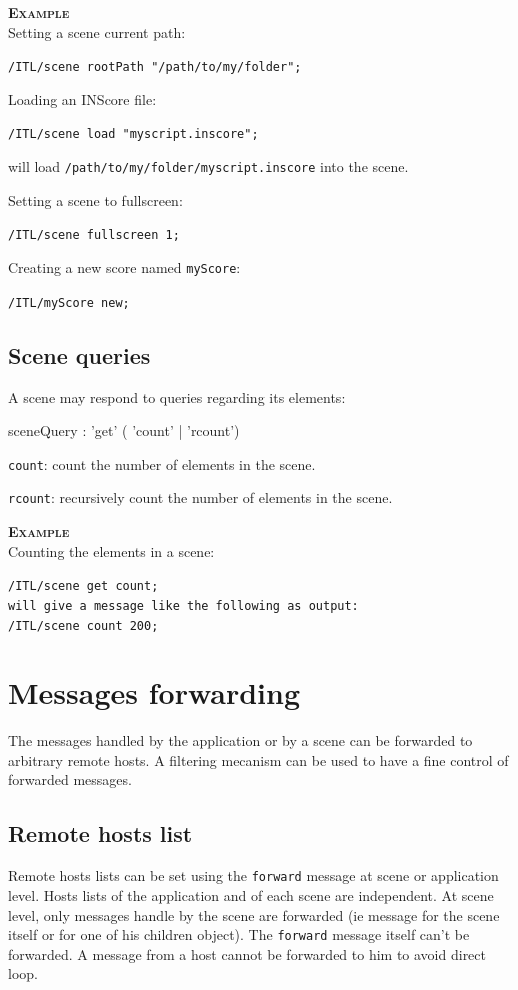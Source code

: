 \documentclass[a4paper,twoside]{report}
\newcommand{\toplevel}[1]	{\chapter{#1}}
\newcommand{\sublevel}[1]	{\section{#1}}
\newcommand{\OSC}[1]		{\texttt{#1}}
\newcommand{\example}		{\textbf{\hspace{-1.5cm}\textbf{\textsc{Example }}}}
\let\olditemize\itemize
\let\oldenditemize\enditemize
\renewenvironment{itemize} 	{\olditemize \setlength{\itemsep}{1mm}}{\oldenditemize}
\newcommand{\sample}	[1]			{\vspace{-2mm}\begin{center}\colorbox{mygrey}{
								\begin{minipage}[t]{0.9\columnwidth} 
								{\small \texttt{#1}}
								\end{minipage}}\end{center}}
\newcommand{\sampleindent}	{ \hspace{0.5cm} }
\begin{document}
\example \\
Setting a scene current path:
\sample{/ITL/scene rootPath "/path/to/my/folder";}
Loading an INScore file:
\sample{/ITL/scene load "myscript.inscore";}
\sampleindent will load \OSC{/path/to/my/folder/myscript.inscore} into the scene. 

Setting a scene to fullscreen:
\sample{/ITL/scene fullscreen 1;}
Creating a new score named \OSC{myScore}:
\sample{/ITL/myScore new;}


\sublevel{Scene queries}
\label{scenequery}

A scene may respond to queries regarding its elements:
\begin{rail}
sceneQuery : 'get' ( 'count'
					| 'rcount')
\end{rail}

\begin{itemize}
\item \OSC{count}: count the number of elements in the scene.
\item \OSC{rcount}: recursively count the number of elements in the scene.
\end{itemize}

\example \\
Counting the elements in a scene:
\sample{/ITL/scene get count;\\
\hspace*{5mm}will give a message like the following as output: \\
/ITL/scene count 200;
}

\toplevel{Messages forwarding}
\label{forwarding}
The messages handled by the application or by a scene can be forwarded to arbitrary remote hosts. A filtering mecanism can be used to have a fine control of forwarded messages.

\sublevel{Remote hosts list}
\label{ITLForward}

Remote hosts lists can be set using the \OSC{forward} message at scene or application level. Hosts lists of the application and of each scene are independent.
At scene level, only messages handle by the scene are forwarded (ie message for the scene itself or for one of his children object).
The \OSC{forward} message itself can't be forwarded. 
A message from a host cannot be forwarded to him to avoid direct loop.
 
\end{document}
